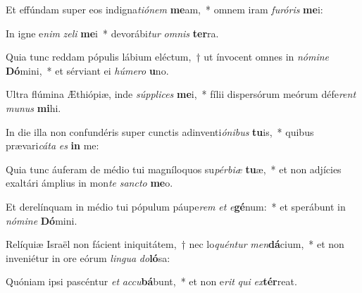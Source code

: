 \item Et effúndam super eos indigna\textit{ti}\textit{ó}\textit{nem} \textbf{me}am,~* omnem iram \textit{fu}\textit{ró}\textit{ris} \textbf{me}i:
\item In igne e\textit{nim} \textit{ze}\textit{li} \textbf{me}i~* devorábi\textit{tur} \textit{om}\textit{nis} \textbf{ter}ra.
\item Quia tunc reddam pópulis lábium eléctum,~† ut ínvocent omnes in \textit{nó}\textit{mi}\textit{ne} \textbf{Dó}mini,~* et sérviant ei \textit{hú}\textit{me}\textit{ro} \textbf{u}no.
\item Ultra flúmina Æthiópiæ, inde \textit{súp}\textit{pli}\textit{ces} \textbf{me}i,~* fílii dispersórum meórum défe\textit{rent} \textit{mu}\textit{nus} \textbf{mi}hi.
\item In die illa non confundéris super cunctis adinventi\textit{ó}\textit{ni}\textit{bus} \textbf{tu}is,~* quibus prævari\textit{cá}\textit{ta} \textit{es} \textbf{in} me:
\item Quia tunc áuferam de médio tui magníloquos su\textit{pér}\textit{bi}\textit{æ} \textbf{tu}æ,~* et non adjícies exaltári ámplius in mon\textit{te} \textit{sanc}\textit{to} \textbf{me}o.
\item Et derelínquam in médio tui pópulum páupe\textit{rem} \textit{et} \textit{e}\textbf{gé}num:~* et sperábunt in \textit{nó}\textit{mi}\textit{ne} \textbf{Dó}mini.
\item Relíquiæ Israël non fácient iniquitátem,~† nec lo\textit{quén}\textit{tur} \textit{men}\textbf{dá}cium,~* et non inveniétur in ore eórum \textit{lin}\textit{gua} \textit{do}\textbf{ló}sa:
\item Quóniam ipsi pascéntur \textit{et} \textit{ac}\textit{cu}\textbf{bá}bunt,~* et non e\textit{rit} \textit{qui} \textit{ex}\textbf{tér}reat.
